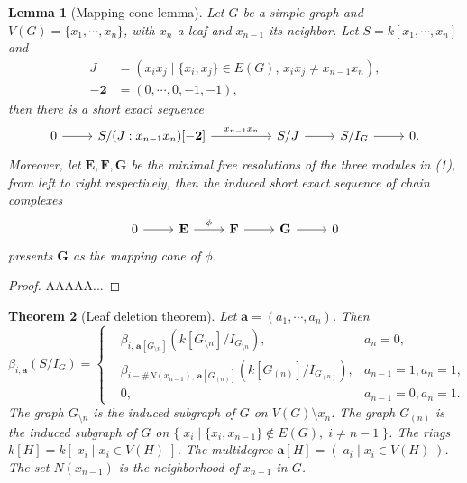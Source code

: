 \documentclass[dvipsnames,10pt]{article}
\newtheorem{theorem}{Theorem}[section]
\newtheorem{lemma}[theorem]{Lemma}
\begin{document}
\begin{lemma}[Mapping cone lemma]
    Let $G$ be a simple graph and $V(G) = \{x_1,\cdots,x_n\}$, with $x_n$ a leaf and $x_{n-1}$ its neighbor. Let $S=k[x_1,\cdots,x_n]$ and
    \begin{align*}
        J&=(x_ix_j\mid \{x_i,x_j\}\in E(G),\,x_ix_j\neq x_{n-1}x_n),\\
        -\mathbf{2} &= (0,\cdots,0,-1,-1),
    \end{align*}
    then there is a short exact sequence
    \begin{equation}
        \begin{tikzcd}
            0 \arrow[r] & S/(J:x_{n-1}x_n)[-\mathbf{2}] \arrow[rr, "{x_{n-1}x_n}"] & & S/J \arrow[r] & S/I_G \arrow[r] & 0.
        \end{tikzcd}
    \end{equation}
    Moreover, let $\mathbf{E}, \mathbf{F}, \mathbf{G}$ be the minimal free resolutions of the three modules in (1), from left to right respectively, then the induced short exact sequence of chain complexes
    \begin{equation*}
        \begin{tikzcd}
            0 \arrow[r] & \mathbf{E} \arrow[r, "\phi"] & \mathbf{F} \arrow[r] & \mathbf{G} \arrow[r] & 0
        \end{tikzcd}
    \end{equation*}
    presents $\mathbf{G}$ as the mapping cone of $\phi$.
\end{lemma}

\begin{proof}
    AAAAA...
\end{proof}

\begin{theorem}[Leaf deletion theorem]
    Let $\mathbf{a}=(a_1,\cdots,a_n)$. Then
    \begin{equation*}
        \beta_{i,\mathbf{a}}(S/I_G) = \left\{
            \begin{aligned}
                &\beta_{i,\,\mathbf{a}[G_{\setminus n}]}(k[G_{\setminus n}]/I_{G_{\setminus n}}), &a_n=0,\\
                &\beta_{i-\#N(x_{n-1}),\,\mathbf{a}[G_{(n)}]}(k[G_{(n)}]/I_{G_{(n)}}), &a_{n-1}=1,a_n=1,\\
                &0, &a_{n-1}=0,a_n=1.
            \end{aligned}
        \right.
    \end{equation*}
    The graph $G_{\setminus n}$ is the induced subgraph of $G$ on $V(G)\setminus {x_n}$. The graph $G_{(n)}$ is the induced subgraph of $G$ on $\{\;x_i\mid \{x_i,x_{n-1}\}\notin E(G),\;i\neq n-1\;\}$. The rings $k[H] = k[\;x_i\mid x_i\in V(H)\;]$. The multidegree $\mathbf{a}[H] = (\;a_i\mid x_i\in V(H)\;)$. The set $N(x_{n-1})$ is the neighborhood of $x_{n-1}$ in $G$.
\end{theorem}
\end{document}
